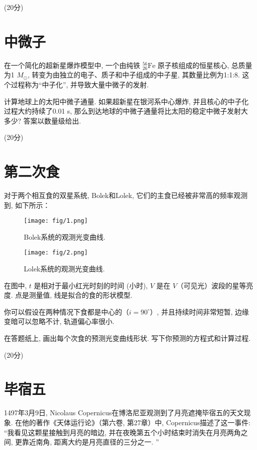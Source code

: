 \documentclass[a4paper,fontset=fandol]{ctexart}
\newcommand{\points}[1]{\par %
	\noindent %
	\hfill (#1分)%
	\vspace{1em}
	}
\begin{document}
	\points{20}
	
	\section{中微子}
	
	在一个简化的超新星爆炸模型中, 一个由纯铁 ${}^{56}_{26}\text{Fe}$ 原子核组成的恒星核心, 总质量为1 \( M_\odot \), 转变为由独立的电子、质子和中子组成的中子星, 其数量比例为1:1:8. 这个过程称为``中子化'', 并导致大量中微子的发射. 
	
	计算地球上的太阳中微子通量. 如果超新星在银河系中心爆炸, 并且核心的中子化过程大约持续了0.01 s, 那么到达地球的中微子通量将比太阳的稳定中微子发射大多少? 答案以数量级给出. 
	
	\points{20}
	
	\section{第二次食}
	
	对于两个相互食的双星系统, Bolek和Lolek, 它们的主食已经被非常高的频率观测到, 如下所示：
	
	\begin{figure}[!h]
		\centering
		\texttt{[image: fig/1.png]}
		\caption{Bolek系统的观测光变曲线. }
		\label{fig:1}
	\end{figure}
	
	\begin{figure}[!h]
		\centering
		\texttt{[image: fig/2.png]}
		\caption{Lolek系统的观测光变曲线. }
		\label{fig:2}
	\end{figure}
	
	在图中, \( t \) 是相对于最小红光时刻的时间 (小时), \( V \) 是在 \( V \)（可见光）波段的星等亮度. 点是测量值, 线是拟合的食的形状模型. 
	
	你可以假设在两种情况下食都是中心的（\( i = 90^\circ \)）, 并且持续时间非常短暂, 边缘变暗可以忽略不计, 轨道偏心率很小. 
	
	在答题纸上, 画出每个次食的预测光变曲线形状. 写下你预测的方程式和计算过程. 
	
	\points{20}
	
	\section{毕宿五}
	
	1497年3月9日, Nicolaus Copernicus在博洛尼亚观测到了月亮遮掩毕宿五的天文现象. 
	在他的著作《天体运行论》（第六卷, 第27章）中, Copernicus描述了这一事件: ``我看见这颗星接触到月亮的暗边, 并在夜晚第五个小时结束时消失在月亮两角之间, 更靠近南角, 距离大约是月亮直径的三分之一. ''
	
\end{document}
